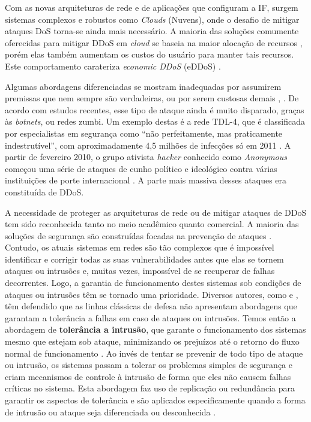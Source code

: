 Com as novas arquiteturas de rede e de aplicações que configuram a IF, surgem sistemas complexos e robustos como \emph{Clouds} (Nuvens), onde o desafio de mitigar ataques DoS torna-se ainda mais necessário. A maioria das soluções comumente oferecidas para mitigar DDoS em \emph{cloud} se baseia na maior alocação de recursos \cite{Peng:2007:SND:1216370.1216373}, porém elas também aumentam os custos do usuário para manter tais recursos. Este comportamento carateriza \emph{economic DDoS} (eDDoS) \cite{Soon:10}.  

Algumas abordagens diferenciadas se mostram inadequadas por assumirem premissas que nem sempre são verdadeiras, ou por serem custosas demais \cite{Bakshi:10}, \cite{Liu:2010:NFD:1866835.1866849}. De acordo com estudos recentes, esse tipo de ataque ainda é muito disparado, graças às \textit{botnets}, ou redes zumbi. Um exemplo destas é a rede TDL-4, que é classificada por especialistas em segurança como “não perfeitamente, mas praticamente indestrutível”, com aproximadamente 4,5 milhões de infecções só em 2011 \cite{tdl4}. A partir de fevereiro 2010, o grupo ativista \textit{hacker} conhecido como \textit{Anonymous} começou uma série de ataques de cunho político e ideológico contra várias instituições de porte internacional \cite{titstorm}. A parte mais massiva desses ataques era constituída de DDoS.

A necessidade de proteger as arquiteturas de rede ou de mitigar ataques de DDoS tem sido reconhecida tanto no meio acadêmico quanto comercial. A maioria das soluções de segurança são construídas focadas na prevenção de ataques \cite{4429182}. Contudo, os atuais sistemas em redes são tão complexos que é impossível identificar e corrigir todas as suas vulnerabilidades antes que elas se tornem ataques ou intrusões e, muitas vezes, impossível de se recuperar de falhas decorrentes. Logo, a garantia de funcionamento destes sistemas sob condições de ataques ou intrusões têm se tornado uma prioridade. Diversos autores, como \cite{Verissimo} e \cite{4796927}, têm defendido que as linhas clássicas de defesa não apresentam abordagens que garantam a tolerância a falhas em caso de ataques ou intrusões. Temos então a abordagem de \textbf{tolerância a intrusão}, que garante o funcionamento dos sistemas mesmo que estejam sob ataque, minimizando os prejuízos até o retorno do fluxo normal de funcionamento \cite{Fraga_Powell_1985}. Ao invés de tentar se prevenir de todo tipo de ataque ou intrusão, os sistemas passam a tolerar os problemas simples de segurança e criam mecanismos de controle à intrusão  de forma que eles não causem falhas críticas no sistema. Esta abordagem faz uso de replicação ou redundância para garantir os aspectos de tolerância e são aplicados especificamente quando a forma de intrusão ou ataque seja diferenciada ou desconhecida \cite{4796927}. 

